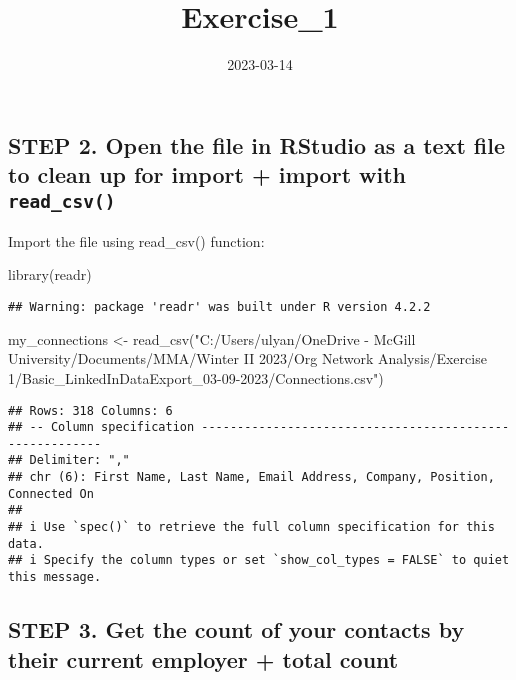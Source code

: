 \documentclass[
]{article}
\title{Exercise\_1}
\author{}
\date{\vspace{-2.5em}2023-03-14}
\newenvironment{Shaded}{\begin{snugshade}}{\end{snugshade}}
\newcommand{\FunctionTok}[1]{\textcolor[rgb]{0.00,0.00,0.00}{#1}}
\newcommand{\NormalTok}[1]{#1}
\newcommand{\OtherTok}[1]{\textcolor[rgb]{0.56,0.35,0.01}{#1}}
\newcommand{\StringTok}[1]{\textcolor[rgb]{0.31,0.60,0.02}{#1}}
\begin{document}
\maketitle

\hypertarget{step-2.-open-the-file-in-rstudio-as-a-text-file-to-clean-up-for-import-import-with-read_csv}{%
\subsection{\texorpdfstring{STEP 2. Open the file in RStudio as a text
file to clean up for import + import with
\texttt{read\_csv()}}{STEP 2. Open the file in RStudio as a text file to clean up for import + import with read\_csv()}}\label{step-2.-open-the-file-in-rstudio-as-a-text-file-to-clean-up-for-import-import-with-read_csv}}

Import the file using read\_csv() function:

\begin{Shaded}
\begin{Highlighting}[]
\FunctionTok{library}\NormalTok{(readr)}
\end{Highlighting}
\end{Shaded}

\begin{verbatim}
## Warning: package 'readr' was built under R version 4.2.2
\end{verbatim}

\begin{Shaded}
\begin{Highlighting}[]
\NormalTok{my\_connections }\OtherTok{\textless{}{-}} \FunctionTok{read\_csv}\NormalTok{(}\StringTok{"C:/Users/ulyan/OneDrive {-} McGill University/Documents/MMA/Winter II 2023/Org Network Analysis/Exercise 1/Basic\_LinkedInDataExport\_03{-}09{-}2023/Connections.csv"}\NormalTok{)}
\end{Highlighting}
\end{Shaded}

\begin{verbatim}
## Rows: 318 Columns: 6
## -- Column specification --------------------------------------------------------
## Delimiter: ","
## chr (6): First Name, Last Name, Email Address, Company, Position, Connected On
## 
## i Use `spec()` to retrieve the full column specification for this data.
## i Specify the column types or set `show_col_types = FALSE` to quiet this message.
\end{verbatim}

\hypertarget{step-3.-get-the-count-of-your-contacts-by-their-current-employer-total-count}{%
\subsection{STEP 3. Get the count of your contacts by their current
employer + total
count}\label{step-3.-get-the-count-of-your-contacts-by-their-current-employer-total-count}}
\end{document}
